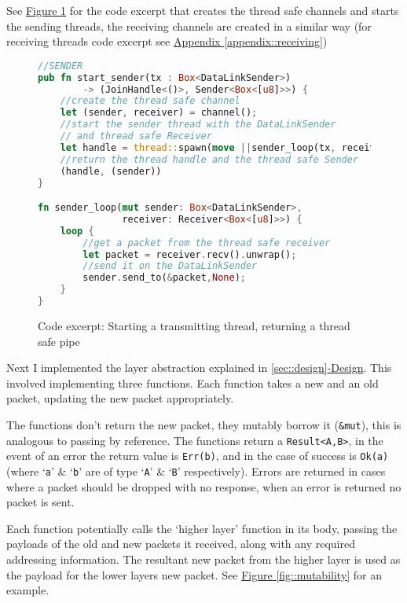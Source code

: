 \documentclass[12pt,a4paper,twoside,openany]{report}
\begin{document}
See \hyperref[fig::sending]{Figure }\ref{fig::sending} for the code excerpt that creates the thread safe channels and starts the sending threads, the receiving channels are created in a similar way (for receiving threads code excerpt see \hyperref[appendix::receiving]{Appendix }\ref{appendix::receiving})
\begin{figure}
\centering
\begin{varwidth}{\linewidth}
\begin{lstlisting}[language=Rust]
//SENDER
pub fn start_sender(tx : Box<DataLinkSender>) 
 		-> (JoinHandle<()>, Sender<Box<[u8]>>) {
    //create the thread safe channel
    let (sender, receiver) = channel();
    //start the sender thread with the DataLinkSender 
    // and thread safe Receiver
    let handle = thread::spawn(move ||sender_loop(tx, receiver));
    //return the thread handle and the thread safe Sender
    (handle, (sender))
}

fn sender_loop(mut sender: Box<DataLinkSender>, 
			   receiver: Receiver<Box<[u8]>>) {
    loop {
    	//get a packet from the thread safe receiver
        let packet = receiver.recv().unwrap();
        //send it on the DataLinkSender
        sender.send_to(&packet,None);
    }
}
\end{lstlisting}
\end{varwidth}
\caption{Code excerpt: Starting a transmitting thread, returning a thread safe pipe}
\label{fig::sending}
\end{figure}

\bigskip

Next I implemented the layer abstraction explained in \ref{sec::design}\hyperref[sec::design]{-Design}.  This involved implementing three functions. Each function takes a new and an old packet, updating the new packet appropriately.

The functions don't  return the new packet, they mutably borrow it (\verb!&mut!), this is analogous to passing by reference. The functions return a \verb!Result<A,B>!, in the event of an error the return value is \verb!Err(b)!, and in the case of success is \verb!Ok(a)! (where `\verb!a!' \& `\verb!b!' are of type `\verb!A!' \& `\verb!B!' respectively).  Errors are returned in cases where a packet should be dropped with no response, when an error is returned no packet is sent. 

Each function potentially calls the `higher layer' function in its body, passing the payloads of the old and new packets it received, along with any required addressing information. The resultant new packet from the higher layer is used as the payload for the lower layers new packet. See \hyperref[fig::mutability]{Figure }\ref{fig::mutability} for an example.
\end{document}
